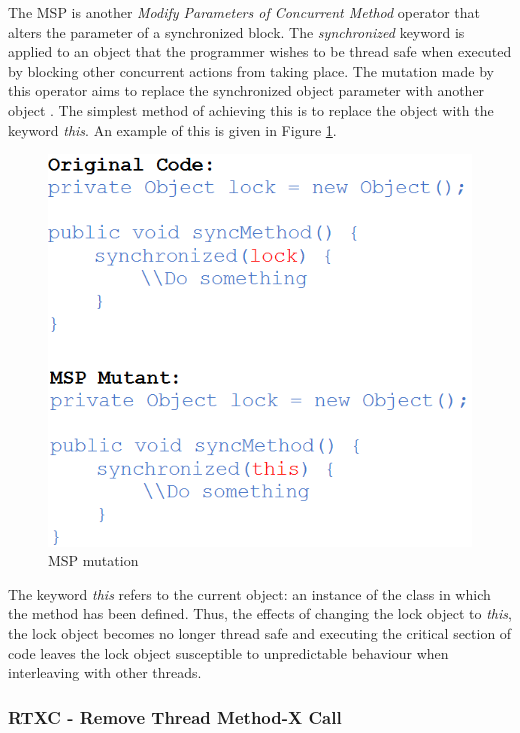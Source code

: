 \documentclass[a4paper,12pt]{article}
\begin{document}
The MSP is another \textit{Modify Parameters of Concurrent Method} operator that alters the parameter of a synchronized block. The \textit{synchronized} keyword is applied to an object that the programmer wishes to be thread safe when executed by blocking other concurrent actions from taking place. The mutation made by this operator aims to replace the synchronized object parameter with another object \citep{bradbury06}. The simplest method of achieving this is to replace the object with the keyword \textit{this}. An example of this is given in Figure \ref{fig:MSP}.

\begin{figure}[h]
    \centering
    \includegraphics[scale = 0.6]{MSP.png}
    \caption{MSP mutation \citep{bradbury06}}
    \label{fig:MSP}
\end{figure}

The keyword \textit{this} refers to the current object: an instance of the class in which the method has been defined. Thus, the effects of changing the lock object to \textit{this}, the lock object becomes no longer thread safe and executing the critical section of code leaves the lock object susceptible to unpredictable behaviour when interleaving with other threads.  

\subsubsection{RTXC - Remove Thread Method-X Call}
\end{document}
